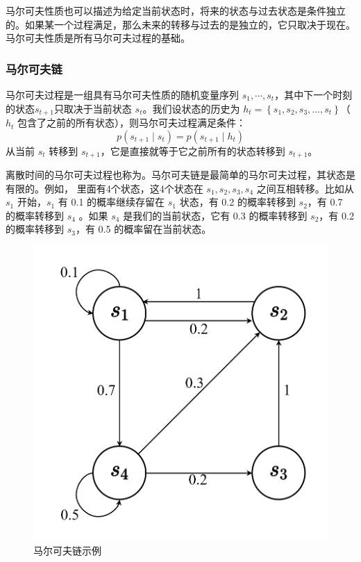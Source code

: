 马尔可夫性质也可以描述为给定当前状态时，将来的状态与过去状态是条件独立的。如果某一个过程满足，那么未来的转移与过去的是独立的，它只取决于现在。
马尔可夫性质是所有马尔可夫过程的基础。
\subsubsection{马尔可夫链}
马尔可夫过程是一组具有马尔可夫性质的随机变量序列 $s_1,\cdots,s_t$，其中下一个时刻的状态$s_{t+1}$只取决于当前状态 $s_t$。我们设状态的历史为 $h_{t}=\left\{s_{1}, s_{2}, s_{3}, \ldots, s_{t}\right\}$（$h_t$ 包含了之前的所有状态），则马尔可夫过程满足条件：
\begin{equation}
  \label{eq:}
  p\left(s_{t+1} \mid s_{t}\right) =p\left(s_{t+1} \mid h_{t}\right)
\end{equation}
从当前 $s_t$ 转移到 $s_{t+1}$，它是直接就等于它之前所有的状态转移到 $s_{t+1}$。

离散时间的马尔可夫过程也称为。马尔可夫链是最简单的马尔可夫过程，其状态是有限的。例如， 里面有4个状态，这4个状态在 $s_1,s_2,s_3,s_4$ 之间互相转移。比如从 $s_1$ 开始，$s_1$ 有 0.1 的概率继续存留在 $s_1$ 状态，有 0.2 的概率转移到 $s_2$，有 0.7 的概率转移到 $s_4$ 。如果 $s_4$ 是我们的当前状态，它有 0.3 的概率转移到 $s_2$，有 0.2 的概率转移到 $s_3$，有 0.5 的概率留在当前状态。

\begin{figure}[htb]
  \centering
  \includegraphics[width=0.3\linewidth]{res/ch2/2.5}
  \caption{马尔可夫链示例}
  \label{fig:mp_example}
\end{figure}

